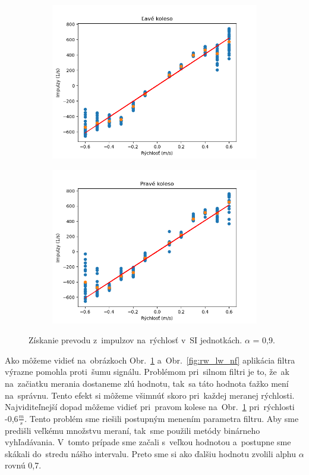 \begin{figure}[!htbp]
	\begin{subfigure}{0.5\textwidth}
		\includegraphics[width=\textwidth]{img/lw_09250.png}
	\end{subfigure}
	\hfill
	\begin{subfigure}{0.5\textwidth}
		\includegraphics[width=\textwidth]{img/rw_09250.png}
	\end{subfigure}
	\caption{Získanie prevodu z~impulzov na~rýchlosť v~SI jednotkách. $\alpha$ = 0,9.}
	\label{fig:rw_lw_09250}
\end{figure}

Ako môžeme vidieť na~obrázkoch Obr.~\ref{fig:rw_lw_09250} a~Obr.~\ref{fig:rw_lw_nf} aplikácia filtra výrazne pomohla proti~šumu signálu.
Problémom pri~silnom filtri je to, že~ak na~začiatku merania dostaneme zlú hodnotu, tak~sa táto hodnota ťažko mení na~správnu. Tento
efekt si môžeme všimnúť skoro pri~každej meranej rýchlosti. Najviditeľnejší dopad môžeme vidieť pri~pravom kolese
na~Obr.~\ref{fig:rw_lw_09250} pri~rýchlosti -0,6$\frac{m}{s}$. Tento problém sme riešili postupným menením parametra filtru.
Aby sme predišli veľkému množstvu meraní, tak~sme použili metódy binárneho vyhľadávania. V~tomto prípade sme začali s~veľkou hodnotou
a~postupne sme skákali do~stredu nášho intervalu. Preto sme si ako ďalšiu hodnotu zvolili alphu $\alpha$ rovnú 0,7.

